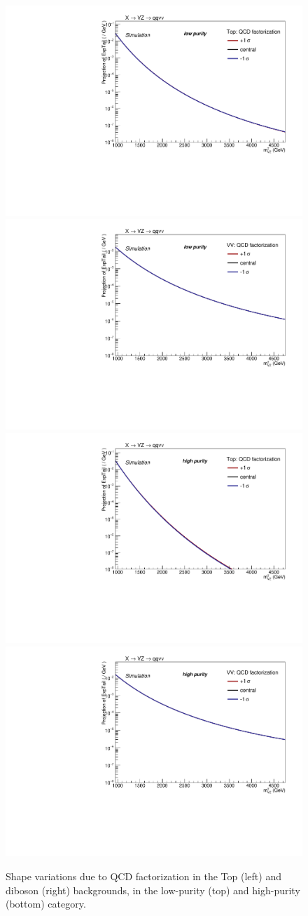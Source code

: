  \begin{figure}[!htb]
   \begin{center}
     \includegraphics[width=.495\textwidth]{plotsAlpha_tesi/XVZnnlp/SysTop_QCD.pdf}
     \includegraphics[width=.495\textwidth]{plotsAlpha_tesi/XVZnnlp/SysVV_QCD.pdf}
     \\
     \includegraphics[width=.495\textwidth]{plotsAlpha_tesi/XVZnnhp/SysTop_QCD.pdf}
     \includegraphics[width=.495\textwidth]{plotsAlpha_tesi/XVZnnhp/SysVV_QCD.pdf}

   \end{center}
   \caption{Shape variations due to QCD factorization in the Top (left) and diboson (right) backgrounds, in the low-purity (top) and high-purity (bottom) category.}
   \label{fig:sysScale}
 \end{figure}


